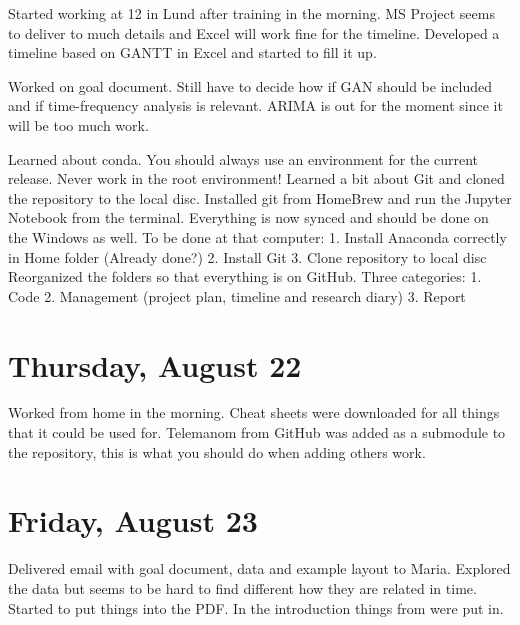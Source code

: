 \documentclass[11pt,letterpaper]{article}
\begin{document}
Started working at 12 in Lund after training in the morning. MS Project seems to deliver to much details and Excel will work fine for the timeline. Developed a timeline based on GANTT in Excel and started to fill it up.

Worked on goal document. Still have to decide how if GAN should be included and if time-frequency analysis is relevant. ARIMA is out for the moment since it will be too much work.

Learned about conda. You should always use an environment for the current release. Never work in the root environment! Learned a bit about Git and cloned the repository to the local disc. Installed git from HomeBrew and run the Jupyter Notebook from the terminal. Everything is now synced and should be done on the Windows as well. To be done at that computer:
1. Install Anaconda correctly in Home folder (Already done?)
2. Install Git
3. Clone repository to local disc
Reorganized the folders so that everything is on GitHub. Three categories:
1. Code
2. Management (project plan, timeline and research diary)
3. Report



\section*{Thursday, August 22}

Worked from home in the morning. Cheat sheets were downloaded for all things that it could be used for. Telemanom from GitHub was added as a submodule to the repository, this is what you should do when adding others work.



\section*{Friday, August 23}
Delivered email with goal document, data and example layout to Maria. Explored the data but seems to be hard to find different how they are related in time. Started to put things into the PDF.
In the introduction things from \cite{Aggarwal2013a} were put in.

\printbibliography
\end{document}
